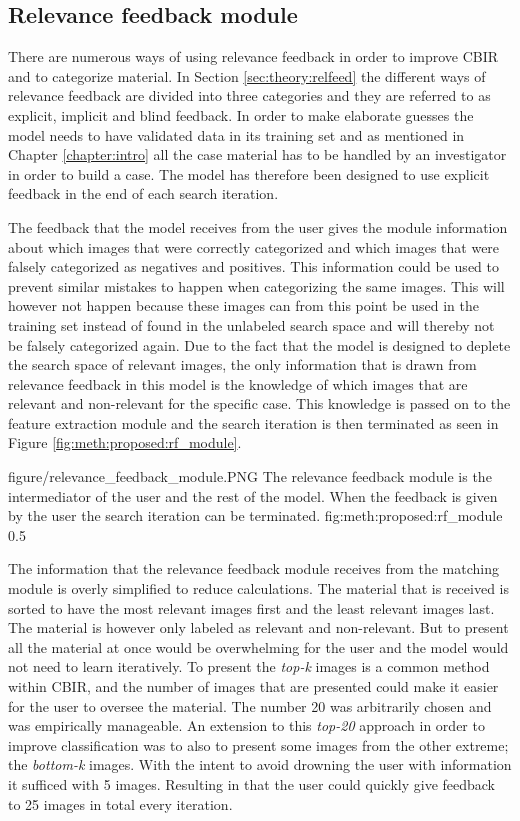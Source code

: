 
\subsection{Relevance feedback module}
\label{sec:method:proposed:rf}
There are numerous ways of using relevance feedback in order to improve CBIR and to categorize material. In Section \ref{sec:theory:relfeed} the different ways of relevance feedback are divided into three categories and they are referred to as explicit, implicit and blind feedback. 
In order to make elaborate guesses the model needs to have validated data in its training set and as mentioned in Chapter \ref{chapter:intro} all the case material has to be handled by an investigator in order to build a case. The model has therefore been designed to use explicit feedback in the end of each search iteration.

The feedback that the model receives from the user gives the module information about which images that were correctly categorized and which images that were falsely categorized as negatives and positives. This information could be used to prevent similar mistakes to happen when categorizing the same images. This will however not happen because these images can from this point be used in the training set instead of found in the unlabeled search space and will thereby not be falsely categorized again. Due to the fact that the model is designed to deplete the search space of relevant images, the only information that is drawn from relevance feedback in this model is the knowledge of which images that are relevant and non-relevant for the specific case. This knowledge is passed on to the feature extraction module and the search iteration is then terminated as seen in Figure \ref{fig:meth:proposed:rf_module}.

\singlefigurenear
{figure/relevance_feedback_module.PNG}
{The relevance feedback module is the intermediator of the user and the rest of the model. When the feedback is given by the user the search iteration can be terminated.}
{fig:meth:proposed:rf_module}
{0.5}

The information that the relevance feedback module receives from the matching module is overly simplified to reduce calculations. The material that is received is sorted to have the most relevant images first and the least relevant images last. The material is however only labeled as relevant and non-relevant. But to present all the material at once would be overwhelming for the user and the model would not need to learn iteratively. 
To present the \emph{top-k} images is a common method within CBIR, and the number of images that are presented could make it easier for the user to oversee the material. The number 20 was arbitrarily chosen and was empirically manageable. An extension to this \emph{top-20} approach in order to improve classification was to also to present some images from the other extreme; the \emph{bottom-k} images. With the intent to avoid drowning the user with information it sufficed with 5 images. Resulting in that the user could quickly give feedback to 25 images in total every iteration. 
